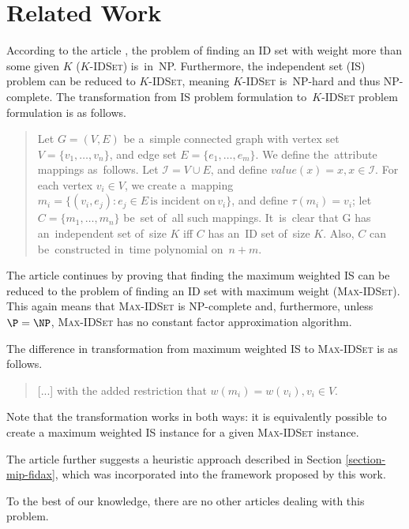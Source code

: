 \chapter{Related Work}
\label{chapter-research}

According to the article \cite[Chapter~4]{fidax}, the problem of finding an ID set with weight more than some given $K$ ($K$-\textsc{IDSet}) is~in~NP. Furthermore, the independent set (IS) problem can be reduced to $K$-\textsc{IDSet}, meaning $K$-\textsc{IDSet} is~NP-hard and thus NP-complete. The transformation from IS problem formulation to~$K$-\textsc{IDSet} problem formulation is as follows.

\begin{quote}
Let $G = (V, E)$ be a~simple connected graph with vertex set $V = \{v_1, \ldots, v_n\}$, and edge set $E = \{e_1, \ldots, e_m\}$. We define the~attribute mappings as~follows. Let $ \mathcal{I} = V \cup E$, and define $value(x) = x, x \in \mathcal{I}$. For each vertex $v_i \in V$, we create a~mapping $m_i = \{(v_i, e_j): e_j \in E \,\text{is incident on}\, v_i \}$, and define $\tau(m_i) = v_i$; let $C = \{m_1, \ldots, m_n\}$ be~set of~all such mappings. It~is~clear that G has an~independent set of~size $K$ iff $C$ has an~ID set of~size $K$. Also, $C$ can be~constructed in~time polynomial on~$n+m$.
\end{quote}

The article continues by proving that finding the maximum weighted IS can be reduced to the problem of finding an ID set with maximum weight (\textsc{Max-IDSet}). This again means that \textsc{Max-IDSet} is NP-complete and, furthermore, unless $\P = \NP$, \textsc{Max-IDSet} has no constant factor approximation algorithm.

The difference in transformation from maximum weighted IS to \textsc{Max-IDSet} is as follows.

\begin{quote}
[...] with the added restriction that $w(m_i) = w(v_i), v_i \in V$.
\end{quote}

Note that the transformation works in both ways: it is equivalently possible to create a maximum weighted IS instance for a given \textsc{Max-IDSet} instance.

The article further suggests a heuristic approach described in Section \ref{section-mip-fidax}, which was incorporated into the framework proposed by this work.

To the best of our knowledge, there are no other articles dealing with this problem.\\

